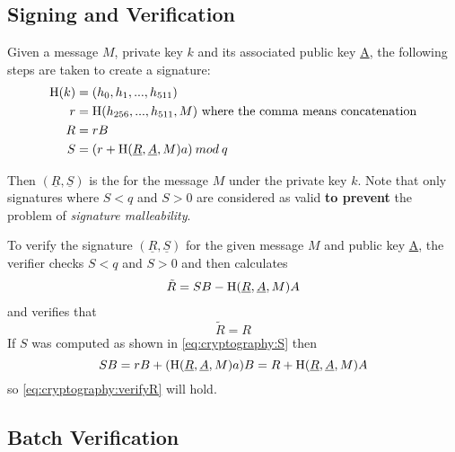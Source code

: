 \subsection{Signing and Verification}

Given a message $M$, private key $k$ and its associated public key \underline{A}, the following steps are taken to create a signature:
\begin{align}
\operatorname{H}(k) &=(h_0, h_1,..., h_{511}) \\
r &= \operatorname{H}(h_{256},...,h_{511}, M) \text{ where the comma means concatenation} \\
R &= rB \\
S &= (r + \operatorname{H}(\underline{R}, \underline{A}, M)a) \: mod \: q \label{eq:cryptography:S}
\end{align}

Then $(\underline{R}, \underline{S})$ is the  for the message $M$ under the private key $k$.
Note that only signatures where $S<q$ and $S>0$ are considered as valid \textbf{to prevent} the problem of \emph{signature malleability}.

To verify the signature $(\underline{R}, \underline{S})$ for the given message $M$ and public key \underline{A}, the verifier checks $S<q$ and $S>0$ and then calculates
\begin{align*}
\tilde{R} = SB - \operatorname{H}(\underline{R}, \underline{A}, M)A
\end{align*}
and verifies that
\begin{equation}
\tilde{R} = R \label{eq:cryptography:verifyR}
\end{equation}
If $S$ was computed as shown in \eqref{eq:cryptography:S} then
$$SB = rB + (\operatorname{H}(\underline{R}, \underline{A}, M)a)B = R + \operatorname{H}(\underline{R}, \underline{A}, M)A$$
so \eqref{eq:cryptography:verifyR} will hold.

\subsection{Batch Verification}


